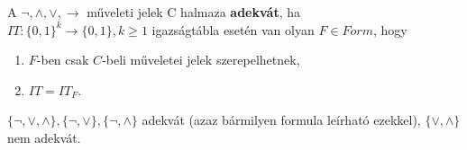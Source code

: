 \documentclass{beamer}
\newcommand{\mbigskip}{\vspace{1em}}
\begin{document}
\begin{frame}

\begin{tcolorbox}[title={Def: Adekvát halmaz}]
A ${\neg}, {\land}, {\lor}, \rightarrow$ műveleti jelek C halmaza \textbf{adekvát}, ha\\
$IT: \{0, 1\}^k \rightarrow \{0, 1\}, k \geq 1$ igazságtábla esetén van olyan $F \in Form$, hogy\\
\begin{enumerate}
\item $F$-ben csak $C$-beli műveletei jelek szerepelhetnek,
\item $IT = IT_F$.
\end{enumerate} 
\end{tcolorbox}
\mbigskip

\begin{tcolorbox}[title={Tétel: Adekvát halmazok}]
$\{\neg, \lor, \land\}, \{\neg, \lor\}, \{\neg, \land\}$ adekvát (azaz bármilyen formula leírható ezekkel), $\{\lor, \land\}$ nem adekvát.
\end{tcolorbox}

\end{frame}
\end{document}

